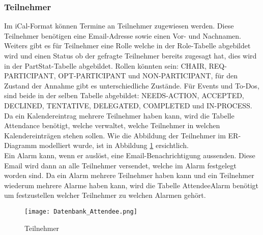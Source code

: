 \subsubsection*{Teilnehmer}
\label{ref:teilnehmer}
Im iCal-Format können Termine an Teilnehmer zugewiesen werden. Diese Teilnehmer benötigen eine Email-Adresse sowie einen Vor- und Nachnamen. Weiters gibt es für Teilnehmer eine Rolle welche in der Role-Tabelle abgebildet wird und einen Status ob der gefragte Teilnehmer bereits zugesagt hat, dies wird in der PartStat-Tabelle abgebildet. Rollen könnten sein: CHAIR, REQ-PARTICIPANT, OPT-PARTICIPANT und NON-PARTICIPANT, für den Zustand der Annahme gibt es unterschiedliche Zustände. Für Events und To-Dos, sind beide in der selben Tabelle abgebildet: NEEDS-ACTION, ACCEPTED, DECLINED, TENTATIVE, DELEGATED, COMPLETED und IN-PROCESS.\\
Da ein Kalendereintrag mehrere Teilnehmer haben kann, wird die Tabelle Attendance benötigt, welche verwaltet, welche Teilnehmer in welchen Kalendereinträgen stehen sollen. Wie die Abbildung der Teilnehmer im ER-Diagramm modelliert wurde, ist in Abbildung \ref{fig:datenbankTeilnehmer} ersichtlich.\\
Ein Alarm kann, wenn er auslöst, eine Email-Benachrichtigung aussenden. Diese Email wird dann an alle Teilnehmer versendet, welche im Alarm festgelegt worden sind. Da ein Alarm mehrere Teilnehmer haben kann und ein Teilnehmer wiederum mehrere Alarme haben kann, wird die Tabelle AttendeeAlarm benötigt um festzustellen welcher Teilnehmer zu welchen Alarmen gehört.
\begin{figure}[H]
	\texttt{[image: Datenbank\_Attendee.png]}
    \caption{Teilnehmer}
    \label{fig:datenbankTeilnehmer}
\end{figure}
\pagebreak